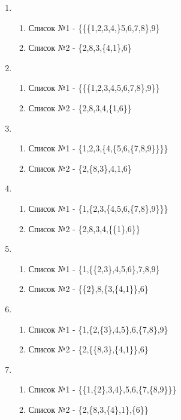 \documentclass[a4paper,12pt]{article}
\begin{document}
\begin{enumerate}
	\item \begin{enumerate}
		\item Список №1 - \{\{\{1,2,3,4,\}5,6,7,8\},9\}
		\item Список №2 - \{2,8,3,\{4,1\},6\}
	\end{enumerate}

	\item \begin{enumerate}
		\item Список №1 - \{\{\{1,2,3,4,5,6,7,8\},9\}\}
		\item Список №2 - \{2,8,3,4,\{1,6\}\}
	\end{enumerate}

	\item \begin{enumerate}
		\item Список №1 - \{1,2,3,\{4,\{5,6,\{7,8,9\}\}\}\}
		\item Список №2 - \{2,\{8,3\},4,1,6\}
	\end{enumerate}

	\item \begin{enumerate}
		\item Список №1 - \{1,\{2,3,\{4,5,6,\{7,8\},9\}\}\}
		\item Список №2 - \{2,8,3,4,\{\{1\},6\}\}
	\end{enumerate}

	\item \begin{enumerate}
		\item Список №1 - \{1,\{\{2,3\},4,5,6\},7,8,9\}
		\item Список №2 - \{\{2\},8,\{3,\{4,1\}\},6\}
	\end{enumerate}

	\item \begin{enumerate}
		\item Список №1 - \{1,\{2,\{3\},4,5\},6,\{7,8\},9\}
		\item Список №2 - \{2,\{\{8,3\},\{4,1\}\},6\}
	\end{enumerate}

	\item \begin{enumerate}
		\item Список №1 - \{\{1,\{2\},3,4\},5,6,\{7,\{8,9\}\}\}
		\item Список №2 - \{2,\{8,3,\{4\},1\},\{6\}\}
	\end{enumerate}


\end{enumerate}
\end{document}
